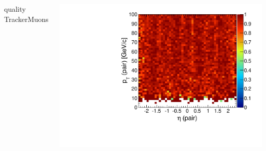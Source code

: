 \documentclass[compress]{beamer}
\begin{document}
\begin{frame}
\begin{columns}
\centering quality TrackerMuons

\includegraphics[width=\linewidth]{pteta_mass10cut_TrackerMuon.pdf}
\end{columns}
\end{frame}
\end{document}

